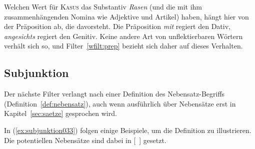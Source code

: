 Welchen Wert für \textsc{Kasus} das Substantiv \textit{Rasen} (und die mit ihm zusammenhängenden Nomina wie Adjektive und Artikel) haben, hängt hier von der Präposition ab, die davorsteht.
Die Präposition \textit{mit} regiert den Dativ, \textit{angesichts} regiert den Genitiv.
Keine andere Art von unflektierbaren Wörtern verhält sich so, und Filter~\ref{wfilt:prep} bezieht sich daher auf dieses Verhalten.


\subsection{Subjunktion}
\label{sec:subjunktion}


Der nächste Filter verlangt nach einer Definition des Nebensatz-Begriffs (Definition~\ref{def:nebensatz}), auch wenn ausführlich über Nebensätze erst in Kapitel~\ref{sec:saetze} gesprochen wird.


In (\ref{ex:subjunktion033}) folgen einige Beispiele, um die Definition zu illustrieren.
Die potentiellen Nebensätze sind dabei in [~] gesetzt.

\begin{exe}
  \ex\label{ex:subjunktion033}\begin{xlist}
  \end{xlist}
\end{exe}

